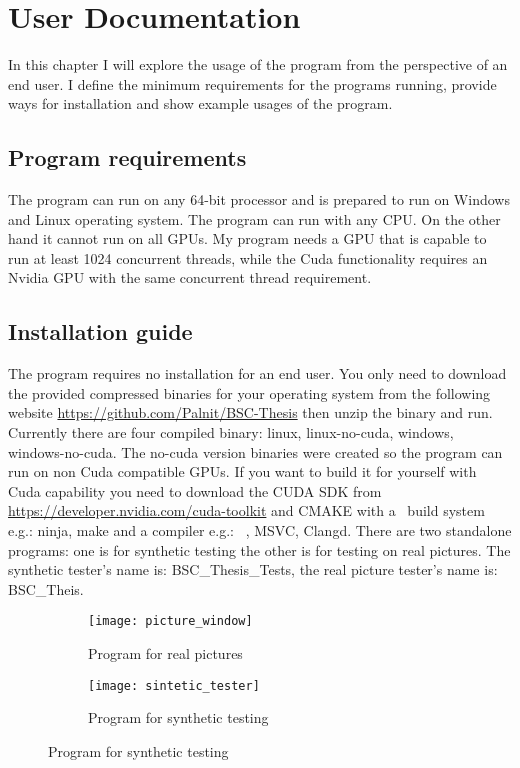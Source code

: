 \chapter{User Documentation}

In this chapter I will explore the usage of the program from the perspective of an end user. I define the minimum requirements for the programs running, provide ways for installation and show example usages of the program.

\section{Program requirements}

The program can run on any 64-bit processor and is prepared to run on Windows and Linux operating system. The program can run with any \ac{CPU}. On the other hand it cannot run on all \ac{GPU}s. My program needs a \ac{GPU} that is capable to run at least 1024 concurrent threads, while the Cuda functionality requires an Nvidia \ac{GPU} with the same concurrent thread requirement.

\section{Installation guide}

The program requires no installation for an end user. You only need to download the provided compressed binaries for your operating system from the following website \href{https://github.com/Palnit/BSC-Thesis}{https://github.com/Palnit/BSC-Thesis} then unzip the binary and run. Currently there are four compiled binary: linux, linux-no-cuda, windows, windows-no-cuda. The no-cuda version binaries were created so the program can run on non Cuda compatible GPUs. If you want to build it for yourself with Cuda capability you need to download the CUDA SDK from \href{https://developer.nvidia.com/cuda-toolkit}{https://developer.nvidia.com/cuda-toolkit} and CMAKE with a \CC\ build system e.g.: ninja, make and a compiler e.g.: \GG\ , MSVC, Clangd. There are two standalone programs: one is for synthetic testing the other is for testing on real pictures. The synthetic tester's name is: BSC\_Thesis\_Tests, the real picture tester's name is: BSC\_Theis. 

\begin{figure}[H]
\begin{minipage}{.49\textwidth}
\begin{figure}[H]
\centering
\texttt{[image: picture\_window]}
\caption{Program for real pictures}
\label{fig:noraml_prog}
\end{figure}
\end{minipage}
\begin{minipage}{.49\textwidth}
\begin{figure}[H]
\centering
\texttt{[image: sintetic\_tester]}
\caption{Program for synthetic testing}
\label{fig:test_prog}
\end{figure}
\end{minipage}
\end{figure}


